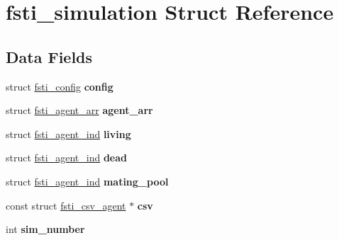 \hypertarget{structfsti__simulation}{}\section{fsti\+\_\+simulation Struct Reference}
\label{structfsti__simulation}
\subsection*{Data Fields}
\begin{DoxyCompactItemize}
\item 
\mbox{\label{structfsti__simulation_a093e3692784567c1afd416022ace5b62}} 
struct \mbox{\hyperlink{structfsti__config}{fsti\+\_\+config}} {\bfseries config}
\item 
\mbox{\label{structfsti__simulation_a897c352e69c8a3bd46c1a602d6380750}} 
struct \mbox{\hyperlink{structfsti__agent__arr}{fsti\+\_\+agent\+\_\+arr}} {\bfseries agent\+\_\+arr}
\item 
\mbox{\label{structfsti__simulation_a303899c120552b30d6694f474351ac02}} 
struct \mbox{\hyperlink{structfsti__agent__ind}{fsti\+\_\+agent\+\_\+ind}} {\bfseries living}
\item 
\mbox{\label{structfsti__simulation_a1e6af515eb855cb2fa8af101bd0f9cb8}} 
struct \mbox{\hyperlink{structfsti__agent__ind}{fsti\+\_\+agent\+\_\+ind}} {\bfseries dead}
\item 
\mbox{\label{structfsti__simulation_a642fddbe7701bc70ce2a5e78c6c40f5a}} 
struct \mbox{\hyperlink{structfsti__agent__ind}{fsti\+\_\+agent\+\_\+ind}} {\bfseries mating\+\_\+pool}
\item 
\mbox{\label{structfsti__simulation_ac24c89a9b7794355c1f8395b7fc0b898}} 
const struct \mbox{\hyperlink{structfsti__csv__agent}{fsti\+\_\+csv\+\_\+agent}} $\ast$ {\bfseries csv}
\item 
\mbox{\label{structfsti__simulation_a679777bd22ba39d528f14a1dc3563233}} 
int {\bfseries sim\+\_\+number}
\item 
\mbox{\label{structfsti__simulation_ac57d2ade56d4449859e872a4aae48236}} 

\end{DoxyCompactItemize}
